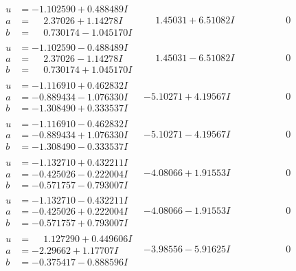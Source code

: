 \documentclass[1p]{elsarticle_modified}
\theoremstyle{definition}
\begin{document}
$$\begin{array}{c|c|c}
\begin{aligned}
u &= -1.102590 + 0.488489 I \\
a &= \phantom{-}2.37026 + 1.14278 I \\
b &= \phantom{-}0.730174 - 1.045170 I\end{aligned}
 & \phantom{-}1.45031 + 6.51082 I & \phantom{-0.000000 } 0 \\ \hline\begin{aligned}
u &= -1.102590 - 0.488489 I \\
a &= \phantom{-}2.37026 - 1.14278 I \\
b &= \phantom{-}0.730174 + 1.045170 I\end{aligned}
 & \phantom{-}1.45031 - 6.51082 I & \phantom{-0.000000 } 0 \\ \hline\begin{aligned}
u &= -1.116910 + 0.462832 I \\
a &= -0.889434 - 1.076330 I \\
b &= -1.308490 + 0.333537 I\end{aligned}
 & -5.10271 + 4.19567 I & \phantom{-0.000000 } 0 \\ \hline\begin{aligned}
u &= -1.116910 - 0.462832 I \\
a &= -0.889434 + 1.076330 I \\
b &= -1.308490 - 0.333537 I\end{aligned}
 & -5.10271 - 4.19567 I & \phantom{-0.000000 } 0 \\ \hline\begin{aligned}
u &= -1.132710 + 0.432211 I \\
a &= -0.425026 - 0.222004 I \\
b &= -0.571757 - 0.793007 I\end{aligned}
 & -4.08066 + 1.91553 I & \phantom{-0.000000 } 0 \\ \hline\begin{aligned}
u &= -1.132710 - 0.432211 I \\
a &= -0.425026 + 0.222004 I \\
b &= -0.571757 + 0.793007 I\end{aligned}
 & -4.08066 - 1.91553 I & \phantom{-0.000000 } 0 \\ \hline\begin{aligned}
u &= \phantom{-}1.127290 + 0.449606 I \\
a &= -2.29662 + 1.17707 I \\
b &= -0.375417 - 0.888596 I\end{aligned}
 & -3.98556 - 5.91625 I & \phantom{-0.000000 } 0 \\ \hline\begin{aligned}

\end{aligned}
\end{array}$$
\end{document}
